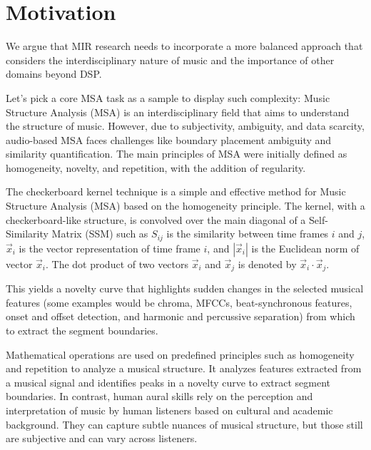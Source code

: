 \section{Motivation}

We argue that MIR research needs to incorporate a more balanced approach that considers the interdisciplinary nature of music and the importance of other domains beyond DSP.

Let's pick a core MSA task as a sample to display such complexity: Music Structure Analysis (MSA) is an interdisciplinary field that aims to understand the structure of music. However, due to subjectivity, ambiguity, and data scarcity, audio-based MSA faces challenges like boundary placement ambiguity and similarity quantification. The main principles of MSA were initially defined as homogeneity, novelty, and repetition, with the addition of regularity.\cite{CLMR2021}

The checkerboard kernel technique is a simple and effective method for Music Structure Analysis (MSA) based on the homogeneity principle. The kernel, with a checkerboard-like structure, is convolved over the main diagonal of a Self-Similarity Matrix (SSM) such as $S_{ij}$ is the similarity between time frames $i$ and $j$, $\vec{x}_i$ is the vector representation of time frame $i$, and $\left| \vec{x}_i \right|$ is the Euclidean norm of vector $\vec{x}_i$. The dot product of two vectors $\vec{x}_i$ and $\vec{x}_j$ is denoted by $\vec{x}_i \cdot \vec{x}_j$.



This yields a novelty curve that highlights sudden changes in the selected musical features (some examples would be chroma, MFCCs, beat-synchronous features, onset and offset detection, and harmonic and percussive separation) from which to extract the segment boundaries.



Mathematical operations are used on predefined principles such as homogeneity and repetition to analyze a musical structure. It analyzes features extracted from a musical signal and identifies peaks in a novelty curve to extract segment boundaries. In contrast, human aural skills rely on the perception and interpretation of music by human listeners based on cultural and academic background. They can capture subtle nuances of musical structure, but those still are subjective and can vary across listeners.


